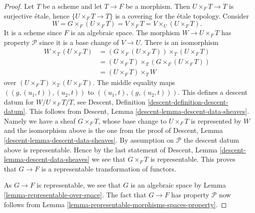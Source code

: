 \documentclass[10pt,a4paper]{amsart}
\theoremstyle{plain}
\theoremstyle{definition}
\theoremstyle{remark}
\numberwithin{equation}{subsection}
\begin{document}
\begin{proof}
Let $T$ be a scheme and let $T \to F$ be a morphism. Then
$U \times_F T \to T$ is surjective \'etale, hence $\{U \times_F T \to T\}$ is
a covering for the \'etale topology. Consider
$$
W = G \times_F (U \times_F T) = V \times_F T = V \times_U (U \times_F T).
$$
It is a scheme since $F$ is an algebraic space. The morphism
$W \to U \times_F T$ has property $\mathcal{P}$ since it is a
base change of $V \to U$. There is an isomorphism
\begin{align*}
W \times_T (U \times_F T) & =
(G \times_F (U \times_F T)) \times_T (U \times_F T) \\
& = (U \times_F T) \times_T (G \times_F (U \times_F T)) \\
& = (U \times_F T) \times_T W
\end{align*}
over $(U \times_F T) \times_T (U \times_F T)$. The middle equality maps
$((g, (u_1, t)), (u_2, t))$ to $((u_1, t), (g, (u_2, t)))$.
This defines a descent datum for $W/U \times_F T/T$, see
Descent, Definition \ref{descent-definition-descent-datum}.
This follows from
Descent, Lemma \ref{descent-lemma-descent-data-sheaves}.
Namely we have a sheaf $G \times_F T$, whose
base change to $U \times_F T$ is represented by $W$ and the isomorphism
above is the one from the proof of
Descent, Lemma \ref{descent-lemma-descent-data-sheaves}.
By assumption on $\mathcal{P}$ the descent datum above is representable.
Hence by the last statement of
Descent, Lemma \ref{descent-lemma-descent-data-sheaves}
we see that $G \times_F T$ is representable. This proves that
$G \to F$ is a representable transformation of functors.

\medskip\noindent
As $G \to F$ is representable, we see that $G$ is an algebraic space by
Lemma \ref{lemma-representable-over-space}. The fact that $G \to F$ has
property $\mathcal{P}$ now follows from
Lemma \ref{lemma-representable-morphisms-spaces-property}.
\end{proof}
\end{document}
